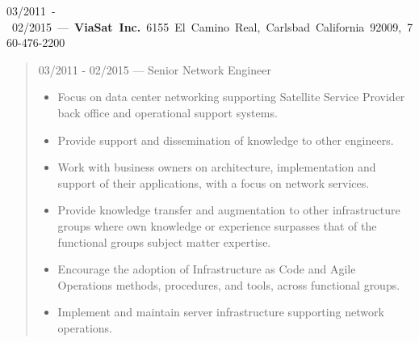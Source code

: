 \mbox{03/2011 - 02/2015 --- {\bf ViaSat Inc.} 6155 El Camino Real, Carlsbad California 92009, 760-476-2200}
\begin{quote}
03/2011 - 02/2015 --- Senior Network Engineer
\begin{itemize}
\item Focus on data center networking supporting Satellite Service Provider
back office and operational support systems.
\item Provide support and dissemination of knowledge to other engineers.
\item Work with business owners on architecture, implementation and support of
their applications, with a focus on network services.
\item Provide knowledge transfer and augmentation to other infrastructure groups
where own knowledge or experience surpasses that of the functional groups
subject matter expertise.
\item Encourage the adoption of Infrastructure as Code and Agile Operations
methods, procedures, and tools, across functional groups.
\item Implement and maintain server infrastructure supporting network
operations.
\end{itemize}
\end{quote}
